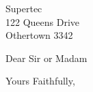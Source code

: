 \documentclass[letter,11pt,DIV15]{scrlttr2}
\begin{document}
\begin{letter}
{Supertec\\
122 Queens Drive\\
Othertown 3342}

\opening{Dear Sir or Madam}
\Blindtext
\closing{Yours Faithfully,}
\vfill
\end{letter}
\end{document}
